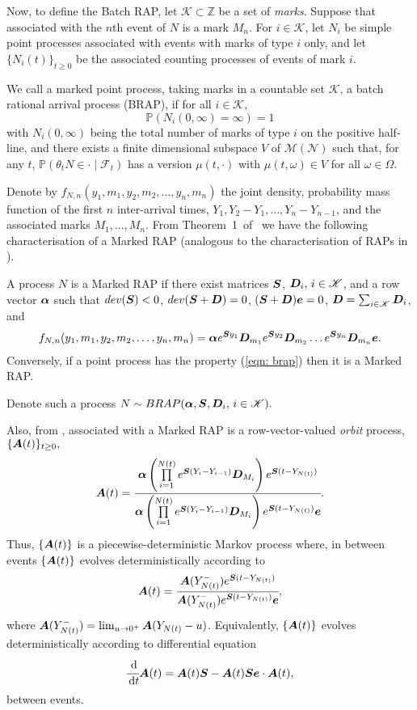 Now, to define the Batch RAP, let \(\mathscr K\subset \mathbb Z\) be a set of \emph{marks}. Suppose that associated with the \(n\)th event  of \(N\) is a mark \(M_n\). For \(i\in\mathscr K\), let \(N_i\) be simple point processes associated with events with marks of type \(i\) only, and let \(\{N_i(t)\}_{t\geq 0}\) be the associated counting processes of events of mark \(i\). 
\begin{defn}[\cite{bn2010}]
	We call a marked point process, taking marks in a countable set \(\mathscr K\), a batch rational arrival process (BRAP), if for all \(i\in\mathscr K\), \[\mathbb P(N_i(0,\infty)=\infty)=1\] with \(N_i(0,\infty)\) being the total number of marks of type \(i\) on the positive half-line, and there exists a finite dimensional subspace \(V\) of \(\mathscr M(\mathscr N)\) such that, for any \(t\), \(\mathbb P(\theta_t N\in \cdot \mid \mathcal F_t)\) has a version \(\mu(t,\cdot)\) with \(\mu(t,\omega)\in V\) for all \(\omega \in \Omega\). 
\end{defn}

Denote by \(f_{N,n}(y_1,m_1,y_2,m_2,\dots,y_n,m_n)\) the joint density, probability mass function of the first \(n\) inter-arrival times, \(Y_1,Y_2-Y_1,\dots,Y_n-Y_{n-1}\), and the associated marks \(M_1,...,M_n\). From Theorem~1~of~\cite{bn2010} we have the following characterisation of a Marked RAP (analogous to the characterisation of RAPs in \cite{ab1999}). 
\begin{thm}\label{thm:qbdrapchar}
A process \(N\) is a Marked RAP if there exist matrices \(\boldsymbol S\), \(\boldsymbol D_i,\,i\in\mathscr K\), and a row vector \(\boldsymbol \alpha\) such that \(dev(\boldsymbol S)<0\), \(dev(\boldsymbol S+\boldsymbol D)=0\), \((\boldsymbol S+\boldsymbol D)\boldsymbol e = 0\), \(\boldsymbol D = \sum_{i\in\mathscr K} \boldsymbol D_i\), and 
\begin{align}f_{N,n}(y_1,m_1,y_2,m_2,\dots,y_n,m_n) = \boldsymbol \alpha e^{\boldsymbol S y_1}\boldsymbol D_{m_1} e^{\boldsymbol S y_2} \boldsymbol D_{m_2}\dots e^{\boldsymbol S y_n} \boldsymbol D_{m_n}\boldsymbol e.\label{eqn: brap}\end{align}
Conversely, if a point process has the property (\ref{eqn: brap}) then it is a Marked RAP.
\end{thm}

Denote such a process \(N\sim BRAP(\boldsymbol \alpha, \boldsymbol S, \boldsymbol D_i,\,i\in\mathscr K).\)

Also, from \cite{bn2010}, associated with a Marked RAP is a row-vector-valued \emph{orbit} process, \(\{\boldsymbol A(t)\}_{t\geq0},\)
\[\boldsymbol A(t) = \cfrac{\boldsymbol \alpha\left( \prod\limits_{i=1}^{N(t)} e^{\boldsymbol S(Y_{i}-Y_{i-1})}\boldsymbol D_{M_i}\right)e^{\boldsymbol S (t-Y_{N(t)})}}{\boldsymbol \alpha\left( \prod\limits_{i=1}^{N(t)} e^{\boldsymbol S(Y_{i}-Y_{i-1})}\boldsymbol D_{M_i}\right)e^{\boldsymbol S( t-Y_{N(t)})}\boldsymbol e}.\]
Thus, \(\{\boldsymbol A(t)\}\) is a piecewise-deterministic Markov process where, in between events \(\{\boldsymbol A(t)\}\) evolves deterministically according to 
\[\boldsymbol A(t) = \cfrac{\boldsymbol A(Y_{N(t)}^-)e^{\boldsymbol S(t-Y_{N(t)})}}{\boldsymbol A(Y_{N(t)}^-)e^{\boldsymbol S(t-Y_{N(t)})}\boldsymbol e},\]
where \(\boldsymbol A(Y_{N(t)}^-) = \lim_{u\to 0^+}\boldsymbol A(Y_{N(t)}-u)\). Equivalently, \(\{\boldsymbol A(t)\}\) evolves deterministically according to differential equation
\[\cfrac{\, \mathrm{d}}{\, \mathrm{d} t} \boldsymbol A(t) = \boldsymbol A(t)\boldsymbol S - \boldsymbol A(t)\boldsymbol S\boldsymbol e\cdot \boldsymbol A(t),\] 
between events. 

